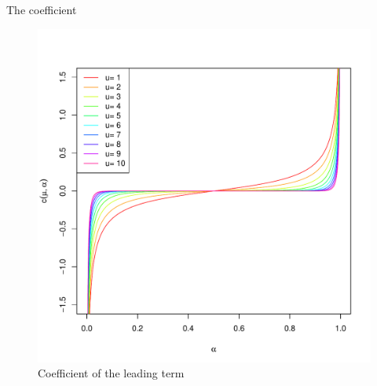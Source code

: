 \documentclass[cjk,10pt]{beamer}
\begin{document}
\begin{frame}{The coefficient}
\begin{figure}[p]
   \includegraphics[scale=0.3]{mu.pdf} %
   \caption{Coefficient of the leading term}
   \label{plot-mu}
\end{figure}
\end{frame}
\end{document}
